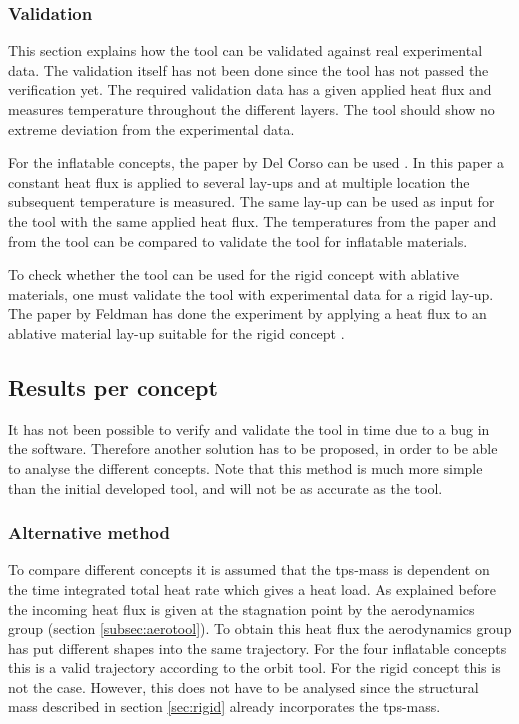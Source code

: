
\subsubsection{Validation}
This section explains how the tool can be validated against real experimental data. The validation itself has not been done since the tool has not passed the verification yet. The required validation data has a given applied heat flux and measures temperature throughout the different layers. The tool should show no extreme deviation from the experimental data. 

For the inflatable concepts, the paper by Del Corso can be used \cite{Corso2009}. In this paper a constant heat flux is applied to several lay-ups and at multiple location the subsequent temperature is measured. The same lay-up can be used as input for the tool with the same applied heat flux. The temperatures from the paper and from the tool can be compared to validate the tool for inflatable materials. 

To check whether the tool can be used for the rigid concept with ablative materials, one must validate the tool with experimental data for a rigid lay-up. The paper by Feldman has done the experiment by applying a heat flux to an ablative material lay-up suitable for the rigid concept \cite{Feldman2012}.


\subsection{Results per concept}
It has not been possible to verify and validate the tool in time due to a bug in the software. Therefore another solution has to be proposed, in order to be able to analyse the different concepts. Note that this method is much more simple than the initial developed tool, and will not be as accurate as the tool. 

\subsubsection{Alternative method}
To compare different concepts it is assumed that the \gls{tps}-mass is dependent on the time integrated total heat rate which gives a heat load. As explained before the incoming heat flux is given at the stagnation point by the aerodynamics group (section \ref{subsec:aerotool}). To obtain this heat flux the aerodynamics group has put different shapes into the same trajectory. For the four inflatable concepts this is a valid trajectory according to the orbit tool. For the rigid concept this is not the case. However, this does not have to be analysed since the structural mass described in section \ref{sec:rigid} already incorporates the \gls{tps}-mass.

